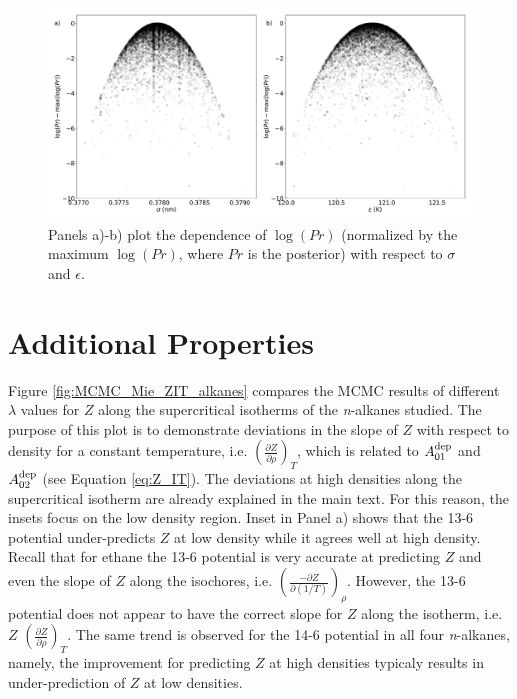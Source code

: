 \documentclass[journal=jctc,manuscript=article]{achemso}
\begin{document}
\begin{figure}[p!]
	\centering
	\includegraphics[width=6.4in]{MCMC_supporting_information_2}
	\caption{Panels a)-b) plot the dependence of $\log(Pr)$ (normalized by the maximum $\log(Pr)$, where $Pr$ is the posterior) with respect to $\sigma$ and $\epsilon$.}
	\label{fig:MCMC_supporting_information_2}
\end{figure} 

\newpage

\section{Additional Properties} \label{Udep and Z_IT}

Figure \ref{fig:MCMC_Mie_ZIT_alkanes} compares the MCMC results of different $\lambda$ values for $Z$ along the supercritical isotherms of the \textit{n}-alkanes studied. The purpose of this plot is to demonstrate deviations in the slope of $Z$ with respect to density for a constant temperature, i.e. $\left(\frac{\partial Z}{\partial \rho}\right)_T$, which is related to $A_{01}^{\rm dep}$ and $A_{02}^{\rm dep}$ (see Equation \ref{eq:Z_IT}). The deviations at high densities along the supercritical isotherm are already explained in the main text. For this reason, the insets focus on the low density region. Inset in Panel a) shows that the 13-6 potential under-predicts $Z$ at low density while it agrees well at high density. Recall that for ethane the 13-6 potential is very accurate at predicting $Z$ and even the slope of $Z$ along the isochores, i.e. $\left(\frac{-\partial Z}{\partial(1/T)}\right)_\rho$. However, the 13-6 potential does not appear to have the correct slope for $Z$ along the isotherm, i.e. $Z$ $\left(\frac{\partial Z}{\partial \rho}\right)_T$. The same trend is observed for the 14-6 potential in all four \textit{n}-alkanes, namely, the improvement for predicting $Z$ at high densities typicaly results in under-prediction of $Z$ at low densities.
\end{document}
